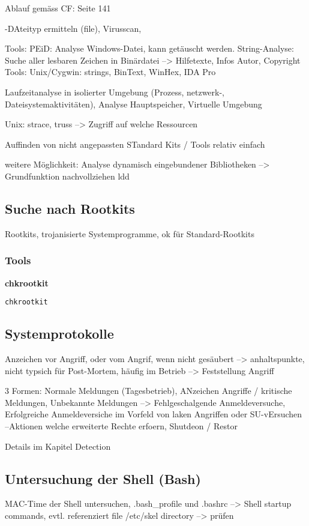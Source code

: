 Ablauf gemäss CF: Seite 141

-DAteityp ermitteln (file), Virusscan, 

Tools: PEiD: Analyse Windows-Datei, kann getäuscht werden.
String-Analyse: Suche aller lesbaren Zeichen in Binärdatei --> Hilfetexte, Infos Autor, Copyright
Tools: Unix/Cygwin: strings, BinText, WinHex, IDA Pro

Laufzeitanalyse in isolierter Umgebung (Prozess, netzwerk-, Dateisystemaktivitäten), Analyse Hauptspeicher, Virtuelle Umgebung

Unix: strace, truss --> Zugriff auf welche Ressourcen

Auffinden von nicht angepassten STandard Kits / Tools relativ einfach

weitere Möglichkeit: Analyse dynamisch eingebundener Bibliotheken --> Grundfunktion nachvollziehen
ldd

\subsection{Suche nach Rootkits}
Rootkits, trojanisierte Systemprogramme, ok für Standard-Rootkits

\subsubsection{Tools}
\textbf{chkrootkit}\\
\begin{lstlisting}
chkrootkit
\end{lstlisting}

\subsection{Systemprotokolle}
Anzeichen vor Angriff, oder vom Angrif, wenn nicht gesäubert --> anhaltspunkte, nicht typsich für Post-Mortem, häufig im Betrieb --> Feststellung Angriff

3 Formen: Normale Meldungen (Tagesbetrieb), ANzeichen Angriffe / kritische Meldungen, Unbekannte Meldungen
--> Fehlgeschalgende Anmeldeversuche, Erfolgreiche Anmeldeversiche im Vorfeld von laken Angriffen oder SU-vErsuchen
--Aktionen welche erweiterte Rechte erfoern, Shutdeon / Restor

Details im Kapitel Detection


\subsection{Untersuchung der Shell (Bash)}
MAC-Time der Shell untersuchen, .bash\_profile und .bashrc --> Shell startup commands, evtl. referenziert file /etc/skel directory --> prüfen

